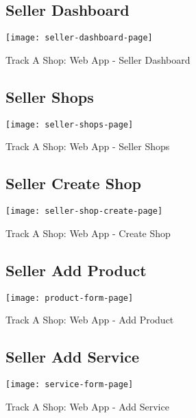 \vspace{2cm}

\begin{figure}[h]
	\subsection{Seller Dashboard\\}
	\centering
	\texttt{[image: seller-dashboard-page]}
	\caption{Track A Shop: Web App - Seller Dashboard}
\end{figure}
\newpage

\begin{figure}[h]
	\subsection{Seller Shops\\}
	\centering
	\texttt{[image: seller-shops-page]}
	\caption{Track A Shop: Web App - Seller Shops}
\end{figure}

\vspace{2cm}

\begin{figure}[h]
	\subsection{Seller Create Shop \\}
	\centering
	\texttt{[image: seller-shop-create-page]}
	\caption{Track A Shop: Web App - Create Shop}
\end{figure}
\newpage

\begin{figure}[h]
	\subsection{Seller Add Product }
	\centering
	\texttt{[image: product-form-page]}
	\caption{Track A Shop: Web App - Add Product}
\end{figure}
\vspace{0.5cm}
\begin{figure}[h]
	\subsection{Seller Add Service \\}
	\centering
	\texttt{[image: service-form-page]}
	\caption{Track A Shop: Web App - Add Service}
\end{figure}
\newpage

